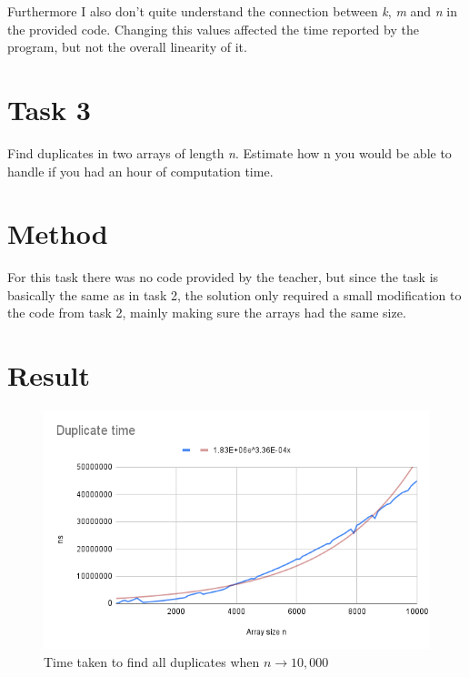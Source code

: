 \documentclass[a4paper,11pt]{article}
\begin{document}
Furthermore I also don't quite understand the connection between \textit{k}, \textit{m} and \textit{n} in the provided code. Changing this values affected the time
reported by the program, but not the overall linearity of it. 

\section*{Task 3}

Find duplicates in two arrays of length \textit{n}. Estimate how n you would be able to handle if you had an hour of computation time.

\section*{Method}
For this task there was no code provided by the teacher, but since the task is basically the same as in task 2, the solution only required a small modification to 
the code from task 2, mainly making sure the arrays had the same size.

\section*{Result}

\begin{figure}[h!]
  \begin{center}
    \includegraphics[width=\textwidth]{task3plot.png}
    \caption{Time taken to find all duplicates when $n\to 10,000$}
  \end{center}
\end{figure}
\end{document}
